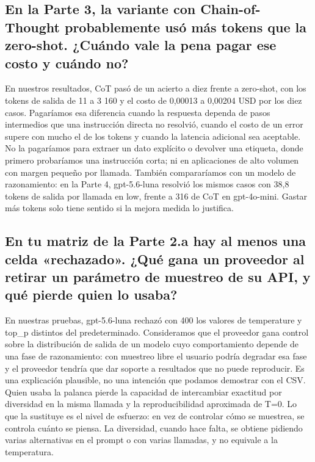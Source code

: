 \documentclass[runningheads]{llncs}
\begin{document}
\subsection{En la Parte 3, la variante con Chain-of-Thought probablemente usó más tokens que la zero-shot. ¿Cuándo vale la pena pagar ese costo y cuándo no?}
En nuestros resultados, CoT pasó de un acierto a diez frente a zero-shot, con
los tokens de salida de 11 a 3 160 y el costo de 0,00013 a 0,00204 USD por los
diez casos. Pagaríamos esa diferencia cuando la respuesta dependa de pasos
intermedios que una instrucción directa no resolvió, cuando el costo de un
error supere con mucho el de los tokens y cuando la latencia adicional sea
aceptable. No la pagaríamos para extraer un dato explícito o devolver una
etiqueta, donde primero probaríamos una instrucción corta; ni en aplicaciones
de alto volumen con margen pequeño por llamada. También compararíamos con un
modelo de razonamiento: en la Parte 4, gpt-5.6-luna resolvió los mismos casos
con 38,8 tokens de salida por llamada en low, frente a 316 de CoT en
gpt-4o-mini. Gastar más tokens solo tiene sentido si la mejora medida lo
justifica.

\subsection{En tu matriz de la Parte 2.a hay al menos una celda «rechazado». ¿Qué gana un proveedor al retirar un parámetro de muestreo de su API, y qué pierde quien lo usaba?}
En nuestras pruebas, gpt-5.6-luna rechazó con 400 los valores de temperature y
top\_p distintos del predeterminado. Consideramos que el proveedor gana control
sobre la distribución de salida de un modelo cuyo comportamiento depende de
una fase de razonamiento: con muestreo libre el usuario podría degradar esa
fase y el proveedor tendría que dar soporte a resultados que no puede
reproducir. Es una explicación plausible, no una intención
que podamos demostrar con el CSV. Quien usaba la palanca pierde la capacidad
de intercambiar exactitud por diversidad en la misma llamada y la
reproducibilidad aproximada de T=0. Lo que la sustituye es el nivel de
esfuerzo: en vez de controlar cómo se muestrea, se controla cuánto se piensa.
La diversidad, cuando hace falta, se obtiene pidiendo varias alternativas en
el prompt o con varias llamadas, y no equivale a la temperatura.
\end{document}
